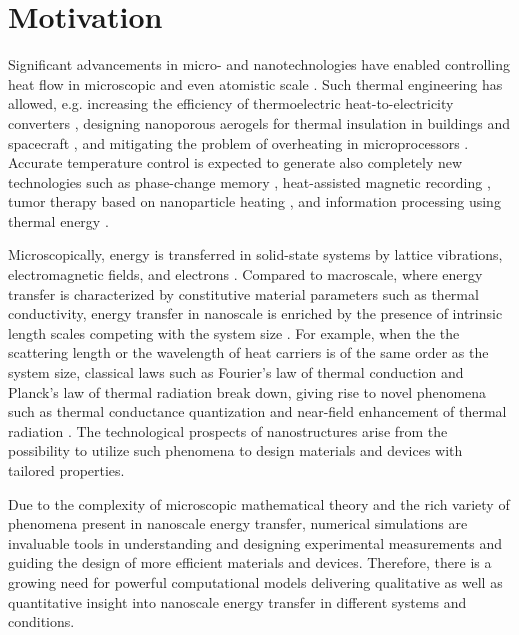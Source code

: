 \label{chap:intro}
\section{Motivation}

Significant advancements in micro- and nanotechnologies have enabled controlling heat flow in microscopic and even atomistic scale \cite{cahill03,cahill14}. Such thermal engineering has allowed, e.g. increasing the efficiency of thermoelectric heat-to-electricity converters \cite{snyder08,vineis10,shakouri11}, designing nanoporous aerogels for thermal insulation in buildings \cite{baetens11} and spacecraft \cite{jones06}, and mitigating the problem of overheating in microprocessors \cite{pop10}. Accurate temperature control is expected to generate also completely new technologies such as phase-change memory \cite{lankhorst05}, heat-assisted magnetic recording \cite{challener09}, tumor therapy based on nanoparticle heating \cite{avedisian09}, and information processing using thermal energy \cite{li12_rmp}. %

Microscopically, energy is transferred in solid-state systems by lattice vibrations, electromagnetic fields, and electrons \cite{chen}. Compared to macroscale, where energy transfer is characterized by constitutive material parameters such as thermal conductivity, energy transfer in nanoscale is enriched by the presence of intrinsic length scales competing with the system size \cite{chen}. For example, when the the scattering length or the wavelength of heat carriers is of the same order as the system size, classical laws such as Fourier's law of thermal conduction \cite{fourier} and Planck's law of thermal radiation \cite{planck00a} break down, giving rise to novel phenomena such as thermal conductance quantization \cite{rego98,angelescu98,schwab00} and near-field enhancement of thermal radiation \cite{volokitin07}. The technological prospects of nanostructures arise from the possibility to utilize such phenomena to design materials and devices with tailored properties. 

Due to the complexity of microscopic mathematical theory and the rich variety of phenomena present in nanoscale energy transfer, numerical simulations are invaluable tools in understanding and designing experimental measurements and guiding the design of more efficient materials and devices. Therefore, there is a growing need for powerful computational models delivering qualitative as well as quantitative insight into nanoscale energy transfer in different systems and conditions. 


